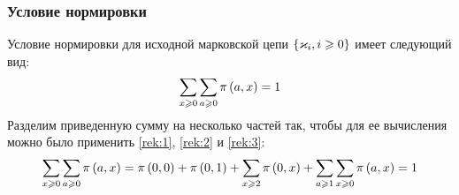 \documentclass[a4paper,14pt,russian]{article}
\newcommand{\Markk}[0]{\brrr{ \vk_i, i \geqslant 0}}
\begin{document}
\subsubsection{Условие нормировки}

Условие нормировки для исходной марковской цепи $\Markk$ имеет следующий вид:
\begin{equation*}
 \sum_{x\geqslant0} \sum_{a\geqslant 0} \pi\left(a,x\right) = 1
\end{equation*}
Разделим приведенную сумму на несколько частей так, чтобы для ее вычисления можно было применить \eqref{rek:1}, \eqref{rek:2} и \eqref{rek:3}:
\begin{equation}
 \sum_{x\geqslant0} \sum_{a\geqslant 0} \pi\left(a,x\right) =  \pi\left(0, 0\right) + \pi\left(0,1\right) +
 \sum_{x \geqslant 2} \pi\left(0,x\right) + \sum_{a \geqslant 1} \sum_{x\geqslant 0} \pi\left(a,x\right) = 1
 \label{norm_constr}
\end{equation}
\end{document}
